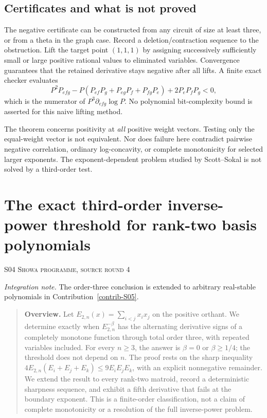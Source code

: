 \documentclass[11pt,a4paper]{article}
\theoremstyle{definition}\newtheorem{definition}[theorem]{Definition}
\theoremstyle{remark}\newtheorem{remark}[theorem]{Remark}
\numberwithin{equation}{section}
\begin{document}
\subsection{Certificates and what is not proved}\label{S03-sec-5}
The negative certificate can be constructed from any circuit of size at least three, or from a theta in the graph case. Record a deletion/contraction sequence to the obstruction. Lift the target point $(1,1,1)$ by assigning successively sufficiently small or large positive rational values to eliminated variables. Convergence guarantees that the retained derivative stays negative after all lifts. A finite exact checker evaluates
\[
 P^2P_{efg}-P(P_{ef}P_g+P_{eg}P_f+P_{fg}P_e)+2P_eP_fP_g<0,
\]
which is the numerator of $P^3\partial_{efg}\log P$.
No polynomial bit-complexity bound is asserted for this naive lifting method.

The theorem concerns positivity at \emph{all} positive weight vectors. Testing only the equal-weight vector is not equivalent. Nor does failure here contradict pairwise negative correlation, ordinary log-concavity, or complete monotonicity for selected larger exponents. The exponent-dependent problem studied by Scott--Sokal is not solved by a third-order test.





\clearpage
\section[S04 --- The exact third-order inverse-power threshold for rank-two basis polynomials]{The exact third-order inverse-power threshold for rank-two basis polynomials}\label{contrib-S04}
\noindent\textsc{S04 \quad Showa programme, source round 4}\par\medskip
\noindent\textit{Integration note.} The order-three conclusion is extended to arbitrary real-stable polynomials in Contribution~\ref{contrib-S05}.\par\medskip



\begin{quote}\small\textbf{Overview.} Let $E_{2,n}(x)=\sum_{i<j}x_ix_j$ on the positive orthant. We determine exactly when $E_{2,n}^{-\beta}$ has the alternating derivative signs of a completely monotone function through total order three, with repeated variables included. For every $n\ge3$, the answer is $\beta=0$ or $\beta\ge1/4$; the threshold does not depend on $n$. The proof rests on the sharp inequality $4E_{2,n}(E_i+E_j+E_k)\le9E_iE_jE_k$, with an explicit nonnegative remainder. We extend the result to every rank-two matroid, record a deterministic sharpness sequence, and exhibit a fifth derivative that fails at the boundary exponent. This is a finite-order classification, not a claim of complete monotonicity or a resolution of the full inverse-power problem.\end{quote}
\end{document}
